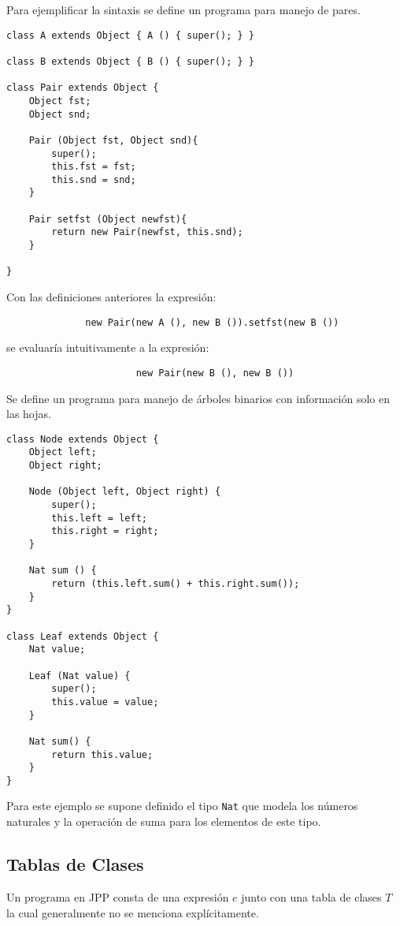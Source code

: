 \documentclass[12pt]{extarticle}
\begin{document}
\begin{example} Para ejemplificar la sintaxis se define un programa para manejo de pares.
\begin{verbatim}
class A extends Object { A () { super(); } }

class B extends Object { B () { super(); } }

class Pair extends Object {
    Object fst;
    Object snd;

    Pair (Object fst, Object snd){
        super();
        this.fst = fst;
        this.snd = snd;
    }

    Pair setfst (Object newfst){
        return new Pair(newfst, this.snd);
    }

}
\end{verbatim}
Con las definiciones anteriores la expresión:
\begin{verbatim}
              new Pair(new A (), new B ()).setfst(new B ())
\end{verbatim}
se evaluaría intuitivamente a la expresión:
\begin{verbatim}
                       new Pair(new B (), new B ())
\end{verbatim}
\end{example}
\begin{example} Se define un programa para manejo de árboles binarios con información solo en las hojas.
\begin{verbatim}
class Node extends Object {
    Object left;
    Object right;

    Node (Object left, Object right) {
        super();
        this.left = left;
        this.right = right;
    }

    Nat sum () {
        return (this.left.sum() + this.right.sum());
    } 
}

class Leaf extends Object {
    Nat value;

    Leaf (Nat value) {
        super();
        this.value = value;
    }

    Nat sum() {
        return this.value;
    }
}
\end{verbatim}
Para este ejemplo se supone definido el tipo {\tt Nat} que modela los números naturales y la operación de suma para los elementos de este tipo.
\end{example}
\subsection{Tablas de Clases}
Un programa en JPP consta de una expresión $e$ junto con una tabla de clases $T$ la cual generalmente no se menciona explícitamente. 
\end{document}
